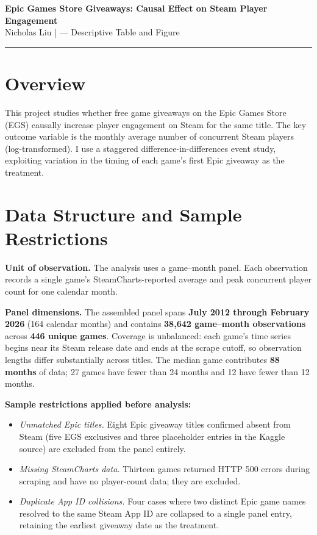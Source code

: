 \documentclass[11pt]{article}
\begin{document}
\begin{center}
  {\large\bfseries Epic Games Store Giveaways: Causal Effect on Steam Player Engagement}\\[0.4em]
  {\small Nicholas Liu \quad| --- Descriptive Table and Figure}
\end{center}

\vspace{0.5em}
\hrule
\vspace{0.8em}

\section{Overview}

This project studies whether free game giveaways on the Epic Games Store (EGS) causally
increase player engagement on Steam for the same title. The key outcome variable is the
monthly average number of concurrent Steam players (log-transformed). I use a staggered
difference-in-differences event study, exploiting variation in the timing of each game's
first Epic giveaway as the treatment.

\section{Data Structure and Sample Restrictions}

\textbf{Unit of observation.} The analysis uses a game--month panel. Each observation
records a single game's SteamCharts-reported average and peak concurrent player count for
one calendar month.

\textbf{Panel dimensions.} The assembled panel spans \textbf{July 2012 through
February 2026} (164 calendar months) and contains \textbf{38,642 game--month
observations} across \textbf{446 unique games}. Coverage is unbalanced: each game's
time series begins near its Steam release date and ends at the scrape cutoff, so
observation lengths differ substantially across titles. The median game contributes
\textbf{88 months} of data; 27 games have fewer than 24 months and 12 have fewer
than 12 months.

\textbf{Sample restrictions applied before analysis:}
\begin{itemize}
  \item \textit{Unmatched Epic titles.} Eight Epic giveaway titles confirmed absent from
    Steam (five EGS exclusives and three placeholder entries in the Kaggle source) are
    excluded from the panel entirely.
  \item \textit{Missing SteamCharts data.} Thirteen games returned HTTP 500 errors
    during scraping and have no player-count data; they are excluded.
  \item \textit{Duplicate App ID collisions.} Four cases where two distinct Epic game
    names resolved to the same Steam App ID are collapsed to a single panel entry,
    retaining the earliest giveaway date as the treatment.
\end{itemize}
\end{document}
